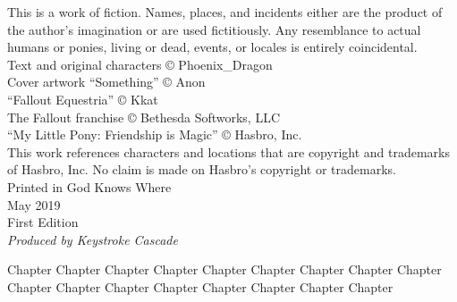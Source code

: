 \documentclass[draft]{novel}
\begin{document}
\clearpage
\thispagestyle{empty}
\null\vspace{2\baselineskip}
\begin{adjustwidth}{4em}{4em}
\begin{center}
\begin{parascale}[0.9]
\noindent
This is a work of fiction. Names, places, and incidents either are the product of the author’s imagination or are used fictitiously. Any resemblance to actual humans or ponies, living or dead, events, or locales is entirely coincidental.\\
\vspace{\baselineskip}
\noindent
Text and original characters © Phoenix\_Dragon\\
Cover artwork “Something” © Anon\\
“Fallout Equestria” © Kkat\\
The Fallout franchise © Bethesda Softworks, LLC\\
“My Little Pony: Friendship is Magic” © Hasbro, Inc.\\
\vspace{\baselineskip}
\noindent
This work references characters and locations that are copyright and trademarks of Hasbro, Inc. No claim is made on Hasbro’s copyright or trademarks.\\
\vspace{11\baselineskip}
\noindent
Printed in God Knows Where\\
May 2019\\
First Edition\\
\vspace{\baselineskip}
\noindent
\textit{Produced by Keystroke Cascade}
\end{parascale}
\end{center}
\end{adjustwidth}

\cleartorecto
\thispagestyle{empty}
\null\vspace{2\baselineskip}
\begin{toc}[0.5]{3em}
{\centering{}\par}
\null\null
Chapter 
Chapter 
Chapter 
Chapter 
Chapter 
Chapter 
Chapter 
Chapter 
Chapter 
Chapter 
Chapter 
Chapter 
Chapter 
Chapter 
Chapter 
Chapter 
Chapter 
\end{toc}
\end{document}
